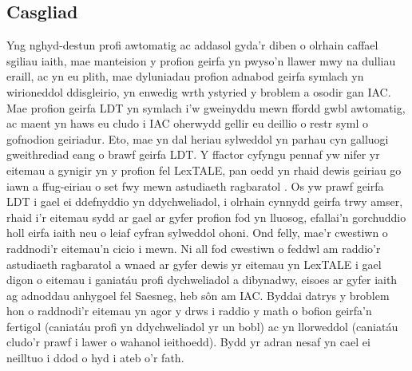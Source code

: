 \subsection{Casgliad}
Yng nghyd-destun profi awtomatig ac addasol gyda'r diben o olrhain caffael sgiliau iaith, mae manteision y profion geirfa yn pwyso'n llawer mwy na dulliau eraill, ac yn eu plith, mae dyluniadau profion adnabod geirfa symlach yn wirioneddol ddisgleirio, yn enwedig wrth ystyried y broblem a osodir gan IAC\@. Mae profion geirfa LDT yn symlach i'w gweinyddu mewn ffordd gwbl awtomatig, ac maent yn haws eu cludo i IAC oherwydd gellir eu deillio o restr syml o gofnodion geiriadur. Eto, mae yn dal heriau sylweddol yn parhau cyn galluogi gweithrediad eang o brawf geirfa LDT\@. Y ffactor cyfyngu pennaf yw nifer yr eitemau a gynigir yn y profion fel LexTALE, pan oedd yn rhaid dewis geiriau go iawn a ffug-eiriau o set fwy mewn astudiaeth ragbaratol \parencite{lemhofer_introducing_2012}. Os yw prawf geirfa LDT i gael ei ddefnyddio yn ddychweliadol, i olrhain cynnydd geirfa trwy amser, rhaid i'r eitemau sydd ar gael ar gyfer profion fod yn lluosog, efallai'n gorchuddio holl eirfa iaith neu o leiaf cyfran sylweddol ohoni. Ond felly, mae'r cwestiwn o raddnodi'r eitemau'n cicio i mewn. Ni all fod cwestiwn o feddwl am raddio'r astudiaeth ragbaratol a wnaed ar gyfer dewis yr eitemau yn LexTALE i gael digon o eitemau i ganiatáu profi dychweliadol a dibynadwy, eisoes ar gyfer iaith ag adnoddau anhygoel fel Saesneg, heb sôn am IAC\@. Byddai datrys y broblem hon o raddnodi'r eitemau yn agor y drws i raddio y math o bofion geirfa'n fertigol (caniatáu profi yn ddychweliadol yr un bobl) ac yn llorweddol (caniatáu cludo'r prawf i lawer o wahanol ieithoedd). Bydd yr adran nesaf yn cael ei neilltuo i ddod o hyd i ateb o'r fath.

